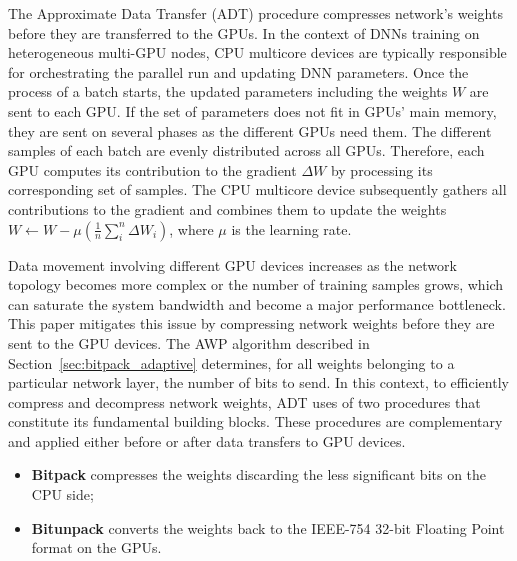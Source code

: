The Approximate Data Transfer (ADT) procedure compresses network's weights
before they are transferred to the GPUs.
In the context of DNNs training on heterogeneous multi-GPU nodes, CPU multicore devices 
are typically responsible for orchestrating the parallel run and updating DNN parameters.
Once the process of a batch starts, the updated parameters including the weights $W$ are sent to each GPU.
If the set of parameters does not fit in GPUs' main memory, they are sent on several phases as the different GPUs need them.
The different samples of each batch are evenly distributed across all GPUs.
Therefore, each GPU computes its contribution to the gradient $\Delta W$ by processing its corresponding set of samples.
The CPU multicore device subsequently gathers all contributions to the gradient and 
combines them to update the weights 
$W \gets W - \mu (\frac{1}{n} \sum_{i}^{n} \Delta W_{i})$, where $\mu$ is 
the learning rate.

Data movement involving different GPU devices increases as the network topology becomes more complex or the number of training samples grows, which can saturate the system bandwidth and become a major performance bottleneck.
This paper mitigates this issue by compressing network weights before they are sent to the GPU devices.
The AWP algorithm described in Section~\ref{sec:bitpack_adaptive} determines, for all  
weights belonging to a particular network layer, the number of bits to send.
In this context, to efficiently compress and decompress network weights, ADT uses of two procedures that constitute its fundamental building blocks. 
These procedures are complementary and applied either before or after data transfers to GPU devices.
\begin{itemize}
    \item \textbf{Bitpack} compresses the weights discarding the less significant bits on the CPU side;
    \item \textbf{Bitunpack} converts the weights back to the IEEE-754 32-bit Floating Point format on the GPUs. 
\end{itemize}

